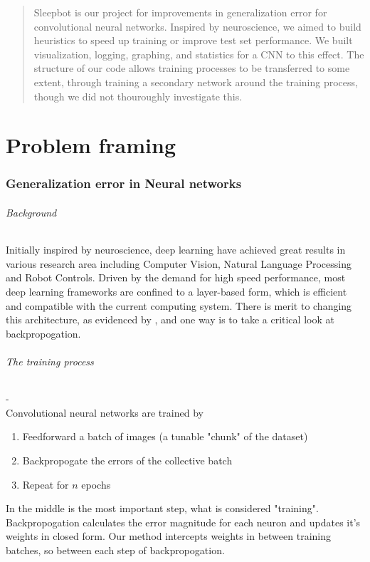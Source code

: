 \documentclass[a1,landscape]{a0poster}
\begin{document}
\begin{multicols}{4} %

\begin{abstract}
	Sleepbot is our project for improvements in generalization error for convolutional neural networks. Inspired by neuroscience, we aimed to build heuristics to speed up training or improve test set performance.
	We built visualization, logging, graphing, and statistics for a CNN to this effect.
	The structure of our code allows training processes to be transferred to some extent, through training a secondary network around the training process, though we did not thouroughly investigate this.
\end{abstract}
\color{NavyBlue}
\small
\part*{Problem framing} 
	\color{Black}
	\section*{Generalization error in Neural networks}
				\paragraph{Background}
				Initially inspired by neuroscience\cite{hobson2002cognitive}, deep learning have achieved great results in various research area including Computer Vision, Natural Language Processing and Robot Controls. Driven by the demand for high speed performance, most deep learning frameworks are confined to a layer-based form, which is efficient and compatible with the current computing system.\cite{krizhevsky2012imagenet}
				There is merit to changing this architecture, as evidenced by \cite{harvey2003skipnet}, and one way is to take a critical look at backpropogation.
        \paragraph{The training process} - \\
        Convolutional neural networks are trained by
        \begin{enumerate}
        	\item Feedforward a batch of images (a tunable "chunk" of the dataset)
        	\item Backpropogate the errors of the collective batch
        	\item Repeat for $n$ epochs
        \end{enumerate}
	      In the middle is the most important step, what is considered "training". Backpropogation calculates the error magnitude for each neuron and updates it's weights in closed form.
	      Our method intercepts weights in between training batches, so between each step of backpropogation.

\end{multicols}
\end{document}
